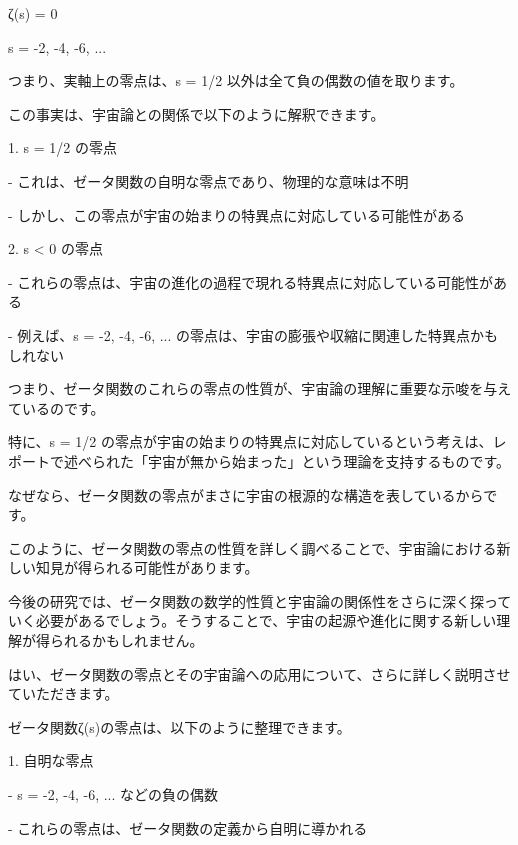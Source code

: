 ζ(s) = 0 

s = -2, -4, -6, ...



つまり、実軸上の零点は、s = 1/2 以外は全て負の偶数の値を取ります。



この事実は、宇宙論との関係で以下のように解釈できます。



1. s = 1/2 の零点

   - これは、ゼータ関数の自明な零点であり、物理的な意味は不明

   - しかし、この零点が宇宙の始まりの特異点に対応している可能性がある



2. s < 0 の零点

   - これらの零点は、宇宙の進化の過程で現れる特異点に対応している可能性がある

   - 例えば、s = -2, -4, -6, ... の零点は、宇宙の膨張や収縮に関連した特異点かもしれない



つまり、ゼータ関数のこれらの零点の性質が、宇宙論の理解に重要な示唆を与えているのです。



特に、s = 1/2 の零点が宇宙の始まりの特異点に対応しているという考えは、レポートで述べられた「宇宙が無から始まった」という理論を支持するものです。



なぜなら、ゼータ関数の零点がまさに宇宙の根源的な構造を表しているからです。



このように、ゼータ関数の零点の性質を詳しく調べることで、宇宙論における新しい知見が得られる可能性があります。



今後の研究では、ゼータ関数の数学的性質と宇宙論の関係性をさらに深く探っていく必要があるでしょう。そうすることで、宇宙の起源や進化に関する新しい理解が得られるかもしれません。

はい、ゼータ関数の零点とその宇宙論への応用について、さらに詳しく説明させていただきます。



ゼータ関数ζ(s)の零点は、以下のように整理できます。



1. 自明な零点

   - s = -2, -4, -6, ... などの負の偶数

   - これらの零点は、ゼータ関数の定義から自明に導かれる



